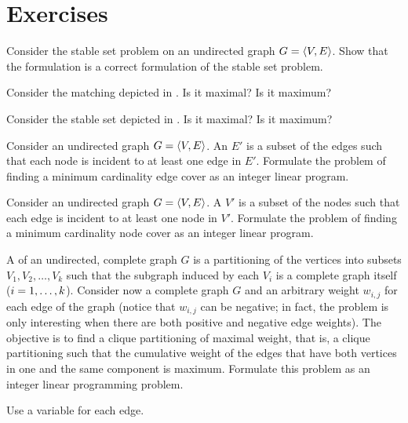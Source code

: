 \section*{Exercises}
\begin{exercise}
Consider the stable set problem on an undirected graph $G=\tupl{V,E}$. Show that the formulation  is a correct formulation of the stable set problem.
\end{exercise}
\begin{exercise}
Consider the matching depicted in . Is it maximal? Is it maximum?
\end{exercise}
\begin{exercise}
Consider the stable set depicted in . Is it maximal? Is it maximum?
\end{exercise}
\begin{exercise}
Consider an undirected graph $G=\tupl{V,E}$. An  $E'$ is a subset of the edges such that each node is incident to at least one edge in $E'$. Formulate the problem of finding a minimum cardinality edge cover as an integer linear program.
\end{exercise}
\begin{exercise}
Consider an undirected graph $G=\tupl{V,E}$. A  $V'$ is a subset of the nodes such that each edge is incident to at least one node in $V'$. Formulate the problem of finding a minimum cardinality node cover as an integer linear program.
\end{exercise}
\begin{exercise}
A  of an undirected, complete graph $G$ is a partitioning of the vertices into subsets $V_1,V_2,\ldots,V_k$ such that the subgraph induced by each $V_i$ is a complete graph itself ($\rangei[i]{1}{k}$). Consider now a complete graph $G$ and an arbitrary weight $w_{i,j}$ for each edge of the graph (notice that $w_{i,j}$ can be negative; in fact, the problem is only interesting when there are both positive and negative edge weights). The objective is to find a clique partitioning of maximal weight, that is, a clique partitioning such that the cumulative weight of the edges that have both vertices in one and the same component is maximum. Formulate this problem as an integer linear programming problem.
\begin{hint}
Use a variable for each edge.
\end{hint}
\end{exercise}
